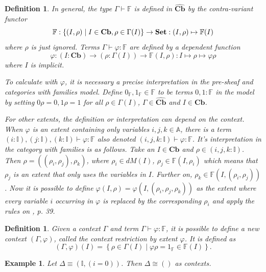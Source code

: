 \documentclass[12pt,a4paper,twoside,xetex]{book} %
\newcommand{\keyword}[1]{\emph{#1}\index{#1}}
\newtheorem{definition}[theorem]{Definition}
\newtheorem{example}[theorem]{Example}
\newcommand{\psh}[1]{\widehat{#1}}
\newcommand{\cube}[0]{\textbf{Cb}}
\begin{document}
\begin{definition}
In general, the type $\Gamma \vdash \mathbb{F}$ is defined in $\psh{\cube}$ by the contra-variant functor $$\mathbb{F} : \left\{ (I, \rho) \mid  I \in 
\cube,  \rho \in \Gamma (I) \right\} \rightarrow \set: (I, \rho) \mapsto 
\mathbb{F}(I)$$ where $\rho$ is just ignored. Terms $\Gamma \vdash \varphi : 
\mathbb{F}$ are defined by a dependent function $$\varphi : (I : \cube) 
\rightarrow (\rho : \Gamma (I)) \rightarrow  \mathbb{F}(I,\rho): I \mapsto \rho 
\mapsto \varphi \rho $$ where $I$ is implicit.

To calculate with $\varphi$, it is necessary a precise interpretation in the 
pre-sheaf and categories with families model. Define $ 0_{\mathbb{F}}, 
1_{\mathbb{F}} \in \mathbb{F}$ to be terms $0,1 : \mathbb{F}$ in the model by 
setting \(0 \rho = 0, 1 \rho = 1\) for all $\rho \in \Gamma (I)$, $\Gamma \in 
\psh{\cube}$ and $I \in \cube$.  

For other extents, the definition or interpretation can depend on the context. 
When $\varphi$ is an extent containing only variables $i,j,k \in \mathbb{A}$, 
there is a term $(i: \mathbb{I}), (j: \mathbb{I}), (k: \mathbb{I}) \vdash 
\varphi : \mathbb{F}$ also denoted $(i,j,k: \mathbb{I}) \vdash \varphi : 
\mathbb{F}$. It's interpretation in the category with families is as follows. 
Take an $I \in \cube$ and  $\rho \in (i,j,k: \mathbb{I})$. Then $\rho = 
((\rho_i, \rho_j), \rho_k)$, where $\rho_i \in dM(I)$, $\rho_j \in 
\mathbb{F}(I,\rho_i)$ which means that $\rho_j$ is an extent that only uses the 
variables in $I$. Further on, $\rho_k \in \mathbb{F}(I, (\rho_i, \rho_j))$. Now 
it is possible to define $\varphi(I,\rho)=\varphi(I,(\rho_i,\rho_j,\rho_k))$ as 
the extent where every variable $i$ occurring in $\varphi$ is replaced by the 
corresponding $\rho_i$ and apply the rules on \cite{Orton2019}, p. 39.
\end{definition}



\begin{definition}\label{contextrestriction}
Given a context $\Gamma$ and term $\Gamma \vdash \varphi : \mathbb{F}$, it is 
possible to define a new context $(\Gamma , \varphi)$, called the 
\keyword{context restriction by extent $\varphi$}. It is defined as  $$(\Gamma 
, \varphi)(I) = \left\{ \rho \in \Gamma (I) \mid \varphi \rho = 1_{\mathbb{F}} 
\in \mathbb{F}(I) \right \} .$$
\end{definition}
 
\begin{example}
Let $\Delta \equiv (\mathbb{I}, (i=0))$. Then 
$\Delta \cong ()$ as contexts.
\end{example} 
\end{document}
